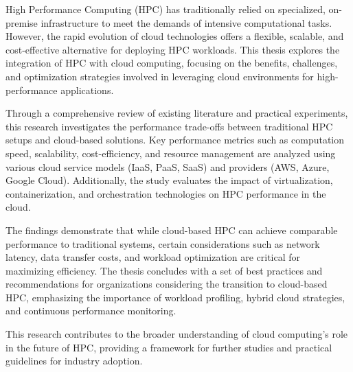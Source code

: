 %
%

High Performance Computing (HPC) has traditionally relied on specialized, on-premise infrastructure to meet the demands of intensive computational tasks. However, the rapid evolution of cloud technologies offers a flexible, scalable, and cost-effective alternative for deploying HPC workloads. This thesis explores the integration of HPC with cloud computing, focusing on the benefits, challenges, and optimization strategies involved in leveraging cloud environments for high-performance applications. 

Through a comprehensive review of existing literature and practical experiments, this research investigates the performance trade-offs between traditional HPC setups and cloud-based solutions. Key performance metrics such as computation speed, scalability, cost-efficiency, and resource management are analyzed using various cloud service models (IaaS, PaaS, SaaS) and providers (AWS, Azure, Google Cloud). Additionally, the study evaluates the impact of virtualization, containerization, and orchestration technologies on HPC performance in the cloud.

The findings demonstrate that while cloud-based HPC can achieve comparable performance to traditional systems, certain considerations such as network latency, data transfer costs, and workload optimization are critical for maximizing efficiency. The thesis concludes with a set of best practices and recommendations for organizations considering the transition to cloud-based HPC, emphasizing the importance of workload profiling, hybrid cloud strategies, and continuous performance monitoring.

This research contributes to the broader understanding of cloud computing's role in the future of HPC, providing a framework for further studies and practical guidelines for industry adoption.
